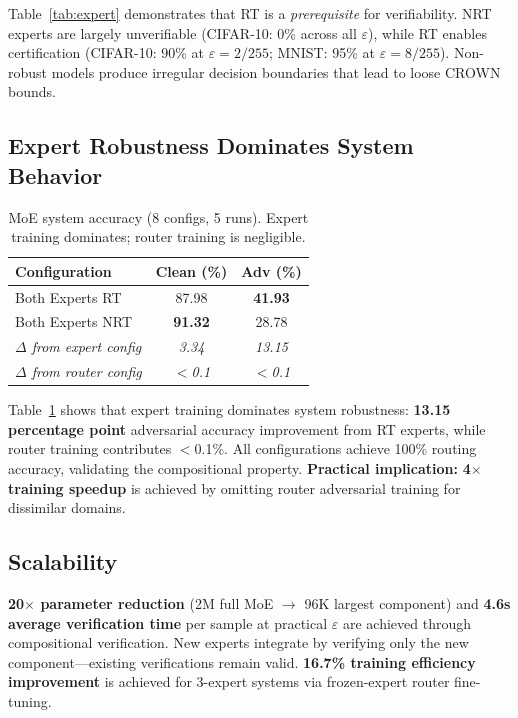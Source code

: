 \documentclass{article}
\theoremstyle{plain}
\theoremstyle{remark}
\begin{document}
Table~\ref{tab:expert} demonstrates that RT is a \textit{prerequisite} for verifiability. NRT experts are largely unverifiable (CIFAR-10: 0\% across all $\varepsilon$), while RT enables certification (CIFAR-10: 90\% at $\varepsilon=2/255$; MNIST: 95\% at $\varepsilon=8/255$). Non-robust models produce irregular decision boundaries that lead to loose CROWN bounds.

\subsection{Expert Robustness Dominates System Behavior}

\begin{table}[!t]
\centering
\small
\begin{tabular}{@{}lcc@{}}
\toprule
\textbf{Configuration} & \textbf{Clean (\%)} & \textbf{Adv (\%)} \\
\midrule
Both Experts RT & 87.98 & \textbf{41.93} \\
Both Experts NRT & \textbf{91.32} & 28.78 \\
\midrule
\textit{$\Delta$ from expert config} & \textit{3.34} & \textit{13.15} \\
\textit{$\Delta$ from router config} & \textit{$<$0.1} & \textit{$<$0.1} \\
\bottomrule
\end{tabular}
\caption{MoE system accuracy (8 configs, 5 runs). Expert training dominates; router training is negligible.}
\label{tab:moe}
\end{table}

Table~\ref{tab:moe} shows that expert training dominates system robustness: \textbf{13.15 percentage point} adversarial accuracy improvement from RT experts, while router training contributes $<$0.1\%. All configurations achieve 100\% routing accuracy, validating the compositional property. \textbf{Practical implication:} \textbf{4$\times$ training speedup} is achieved by omitting router adversarial training for dissimilar domains.

\subsection{Scalability}

\textbf{20$\times$ parameter reduction} (2M full MoE $\to$ 96K largest component) and \textbf{4.6s average verification time} per sample at practical $\varepsilon$ are achieved through compositional verification. New experts integrate by verifying only the new component---existing verifications remain valid. \textbf{16.7\% training efficiency improvement} is achieved for 3-expert systems via frozen-expert router fine-tuning.
\end{document}
